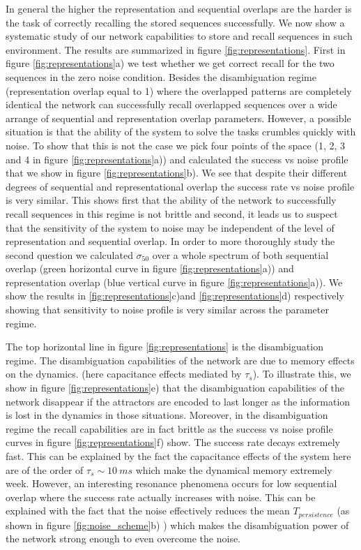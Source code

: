 \documentclass[10pt,a4paper]{article}
\begin{document}
In general the higher the representation and sequential overlaps are the harder is the task of correctly recalling the stored sequences successfully. We now show a systematic study of our network capabilities to store and recall sequences in such environment. The results are summarized in figure \ref{fig:representations}. First in figure \ref{fig:representations}a) we test whether we get correct recall for the two sequences in the zero noise condition. Besides the disambiguation regime (representation overlap equal to 1) where the overlapped patterns are completely identical the network can successfully recall overlapped sequences over a wide arrange of sequential and representation overlap parameters. However, a possible situation is that the ability of the system to solve the tasks crumbles quickly with noise. To show that this is not the case we pick four points of the space (1, 2, 3 and 4 in figure \ref{fig:representations}a)) and calculated the success vs noise profile that we show in figure \ref{fig:representations}b). We see that despite their different degrees of sequential and representational overlap the success rate vs noise profile is very similar. This shows first that the ability of the network to successfully recall sequences in this regime is not brittle and second, it leads us to suspect that the sensitivity of the system to noise may be independent of the level of representation and sequential overlap. In order to more thoroughly study the second question we calculated $\sigma_{50}$ over a whole spectrum of both sequential overlap (green horizontal curve in figure \ref{fig:representations}a)) and representation overlap (blue vertical curve in figure \ref{fig:representations}a)). We show the results in \ref{fig:representations}c)and \ref{fig:representations}d) respectively showing that sensitivity to noise profile is very similar across the parameter regime. 


The top horizontal line in figure \ref{fig:representations} is the disambiguation regime. The disambiguation capabilities of the network are due to memory effects on the dynamics. (here capacitance effects mediated by $\tau_s$). To illustrate this, we show in figure \ref{fig:representations}e) that the disambiguation capabilities of the network disappear if the attractors are encoded to last longer as the information is lost in the dynamics in those situations. Moreover, in the disambiguation regime the recall capabilities are in fact brittle as the success vs noise profile curves in figure \ref{fig:representations}f) show. The success rate decays extremely fast. This can be explained by the fact the capacitance effects of the system here are of the order of $\tau_s \sim 10 \:ms$ which make the dynamical memory extremely week. However, an interesting resonance phenomena occurs for low sequential overlap where the success rate actually increases with noise. This can be explained with the fact that the noise effectively reduces the mean $T_{persistence}$ (as shown in figure \ref{fig:noise_scheme}b) ) which makes the disambiguation power of the network strong enough to even overcome the noise. 
\end{document}
